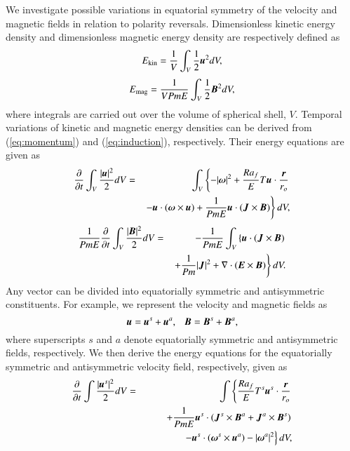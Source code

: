 We investigate possible variations in equatorial symmetry of the velocity and magnetic fields in relation to polarity reversals.
Dimensionless kinetic energy density and dimensionless magnetic energy density are respectively defined as
%
\begin{equation}
E_{\rm kin} = \frac{1}{V}
  \int_V \frac{1}{2} \mbox{\boldmath$u$}^2 d V ,
\label{eq:Ekin}
\end{equation}
%
\begin{equation}
E_{\rm mag} = \frac{1}{V Pm E}
  \int_V \frac{1}{2} \mbox{\boldmath$B$}^2 d V ,
\label{eq:Emag}
\end{equation}
%
where integrals are carried out over the volume of spherical shell, $V$.
Temporal variations of kinetic and magnetic energy densities can be derived from (\ref{eq:momentum}) and (\ref{eq:induction}), respectively.
Their energy equations are given as
%
\begin{eqnarray}
\frac{\partial}{\partial t}
 \int_V \frac{|\mbox{\boldmath$u$}|^2}{2} d V
 &=& \int_V \left\{
    - |\mbox{\boldmath$\omega$}|^2 
    + \frac{Ra_f}{E}T \mbox{\boldmath$u$}\cdot 
    \frac{\mbox{\boldmath$r$}}{r_o}
      \right.
\nonumber \\
 & & \left.
    - \mbox{\boldmath$u$} \cdot (\mbox{\boldmath$\omega$}\times\mbox{\boldmath$u$})
    + \frac{1}{Pm E} \mbox{\boldmath$u$} \cdot
                     (\mbox{\boldmath$J$} \times \mbox{\boldmath$B$})
      \right\} d V,
\label{eq:energy_u}
\end{eqnarray}
%
\begin{eqnarray}
\frac{1}{Pm E}\frac{\partial}{\partial t}
 \int_V \frac{|\mbox{\boldmath$B$}|^2}{2} d V
  & = & 
- \frac{1}{Pm E}\int_V \left\{
      \mbox{\boldmath$u$} \cdot ( \mbox{\boldmath$J$} \times \mbox{\boldmath$B$} )
\right. \nonumber \\
 & &    \left.
    + \frac{1}{Pm} |\mbox{\boldmath$J$}|^2
    + \nabla \cdot ( \mbox{\boldmath$E$} \times \mbox{\boldmath$B$} ) 
      \right\} d V.
\label{eq:energy_B}
\end{eqnarray}
%
Any vector can be divided into equatorially symmetric and antisymmetric constituents.
For example, 
we represent the velocity and magnetic fields as
%
\begin{equation}
\mbox{\boldmath$u$} = \mbox{\boldmath$u$}^s + \mbox{\boldmath$u$}^a, ~~~
\mbox{\boldmath$B$} = \mbox{\boldmath$B$}^s + \mbox{\boldmath$B$}^a,
\label{eq:eqas}
\end{equation}
%
where superscripts $s$ and $a$ denote equatorially symmetric and antisymmetric fields, respectively.
We then derive the energy equations for the equatorially symmetric and antisymmetric velocity field, respectively, given as
%
\begin{eqnarray}
\displaystyle
\frac{\partial}{\partial t}
 \int \frac{|\mbox{\boldmath$u$}^s|^2}{2} d V 
 &=& \int \left\{
      \frac{Ra_f}{E}T^s \mbox{\boldmath$u$}^s\cdot \frac{\mbox{\boldmath$r$}}{r_{o}}
     \right.
\nonumber \\
& & \displaystyle
\hspace*{2em}
     \left.
    + \frac{1}{Pm E} \mbox{\boldmath$u$}^s \cdot
                (\mbox{\boldmath$J$}^s \times \mbox{\boldmath$B$}^a
                +\mbox{\boldmath$J$}^a \times \mbox{\boldmath$B$}^s)
      \right.
\nonumber \\
& &\displaystyle
\hspace*{3em}
      \left.
    - \mbox{\boldmath$u$}^s \cdot 
       (\mbox{\boldmath$\omega$}^s \times \mbox{\boldmath$u$}^a)
    - |\mbox{\boldmath$\omega$}^a|^2 
      \right\} d V,
\label{eq:energy_us}
\end{eqnarray}
